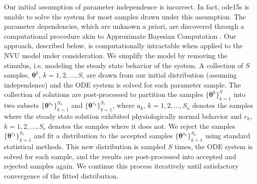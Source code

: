 Our initial assumption of parameter independence is incorrect. In fact, ode15s is unable to solve the system for most samples drawn under this assumption. The parameter dependencies, which are unknown a priori, are discovered through a computational procedure akin to Approximate Bayesian Computation \cite{abc}. Our approach, described below, is computationally intractable when applied to the NVU model under consideration. We simplify the model by removing the stimulus, i.e. modeling the steady state behavior of the system. A collection of $S$ samples, $\boldsymbol{\theta}^k$, $k=1,2,\dots,S$, are drawn from our initial distribution (assuming independence) and the ODE system is solved for each parameter sample. The collection of solutions are post-processed to partition the samples $\{\boldsymbol{\theta}^k\}_{k=1}^S$ into two subsets $\{\boldsymbol{\theta}^{a_k}\}_{k=1}^{S_a}$ and $\{\boldsymbol{\theta}^{r_k}\}_{k=1}^{S_r}$, where $a_k$, $k=1,2,\dots,S_a$ denotes the samples where the steady state solution exhibited physiologically normal behavior and $r_k$, $k=1,2,\dots,S_r$ denotes the samples where it does not. We reject the samples $\{\boldsymbol{\theta}^{r_k}\}_{k=1}^{S_r}$ and fit a distribution to the accepted samples $\{\boldsymbol{\theta}^{a_k}\}_{k=1}^{S_a}$ using standard statistical methods. This new distribution is sampled $S$ times,  the ODE system is solved for each sample, and the results are post-processed into accepted and rejected samples again. We continue this process iteratively until satisfactory convergence of the fitted distribution.


